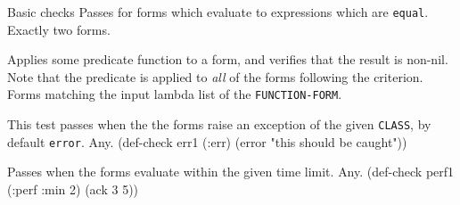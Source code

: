 \begin{criteriaGroup}{Basic checks}
{Passes for forms which evaluate to expressions which are
\texttt{equal}.}
{Exactly two forms.}
{\noExpl}
{\noEx}{}

{Applies some predicate function to a form, and verifies that the
result is non-nil.  Note that the predicate is applied to \emph{all}
of the forms following the criterion.}
{Forms matching the input lambda list of the \texttt{FUNCTION-FORM}.}
{\noExpl}
{\multiEx}
{
 }

{This test passes when the the forms raise an exception of the given
\texttt{CLASS}, by default \texttt{error}.}
{Any.}
{\noExpl}
{\singleEx}{(def-check err1 (:err) (error "this should be caught"))}

{Passes when the forms evaluate within the given time limit.}
{Any.}
{\noExpl}
{\singleEx}{(def-check perf1 (:perf :min 2) (ack 3 5))}

\end{criteriaGroup}

